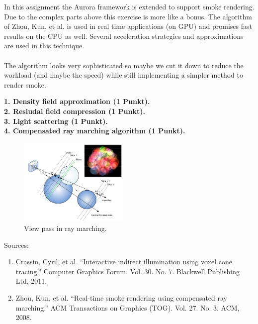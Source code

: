 \documentclass[A4paper]{gdv/gdv}
\newcommand{\teilaufgabe}[1]{\textbf{#1.}}
\begin{document}
\begin{gdvSheet}
In this assignment the Aurora framework is extended to support smoke rendering. Due to the complex parts above this exercise is more like a bonus. The algorithm of Zhou, Kun, et al. is used in real time applications (on GPU) and promises fast results on the CPU as well. Several acceleration strategies and approximations are used in this technique. \\
\\
The algorithm looks very sophisticated so maybe we cut it down to reduce the workload (and maybe the speed) while still implementing a simpler method to render smoke.

\teilaufgabe{1. Density field approximation (1 Punkt)} \\
\teilaufgabe{2. Resiudal field compression (1 Punkt)} \\
\teilaufgabe{3. Light scattering (1 Punkt)} \\
\teilaufgabe{4. Compensated ray marching algorithm (1 Punkt)} \\

\begin{figure}[h]
\centering
\includegraphics[width=200px]{img/smoke.png}
\caption{View pass in ray marching.}
\end{figure}

Sources:
\begin{enumerate}
\item Crassin, Cyril, et al. ``Interactive indirect illumination using voxel cone tracing.'' Computer Graphics Forum. Vol. 30. No. 7. Blackwell Publishing Ltd, 2011.
\item Zhou, Kun, et al. ``Real-time smoke rendering using compensated ray marching.'' ACM Transactions on Graphics (TOG). Vol. 27. No. 3. ACM, 2008.
\end{enumerate}

\vfill
% 
% 
\end{gdvSheet}
\end{document}
